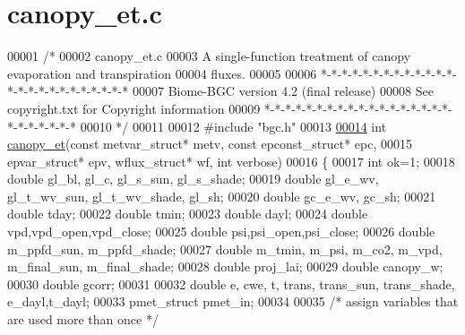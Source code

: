 \hypertarget{canopy__et_8c_source}{}\section{canopy\+\_\+et.\+c}
\label{canopy__et_8c_source}

\begin{DoxyCode}
00001 \textcolor{comment}{/* }
00002 \textcolor{comment}{canopy\_et.c}
00003 \textcolor{comment}{A single-function treatment of canopy evaporation and transpiration}
00004 \textcolor{comment}{fluxes.  }
00005 \textcolor{comment}{}
00006 \textcolor{comment}{*-*-*-*-*-*-*-*-*-*-*-*-*-*-*-*-*-*-*-*-*-*-*-*-*}
00007 \textcolor{comment}{Biome-BGC version 4.2 (final release)}
00008 \textcolor{comment}{See copyright.txt for Copyright information}
00009 \textcolor{comment}{*-*-*-*-*-*-*-*-*-*-*-*-*-*-*-*-*-*-*-*-*-*-*-*-*}
00010 \textcolor{comment}{*/}
00011 
00012 \textcolor{preprocessor}{#include "bgc.h"}
00013 
\hypertarget{canopy__et_8c_source_l00014}{}\hyperlink{canopy__et_8c_a5882089955eaa9ed13e938c6eb383b11}{00014} \textcolor{keywordtype}{int} \hyperlink{canopy__et_8c_a5882089955eaa9ed13e938c6eb383b11}{canopy\_et}(\textcolor{keyword}{const} metvar\_struct* metv, \textcolor{keyword}{const} epconst\_struct* epc, 
00015 epvar\_struct* epv, wflux\_struct* wf, \textcolor{keywordtype}{int} verbose)
00016 \{
00017     \textcolor{keywordtype}{int} ok=1;
00018     \textcolor{keywordtype}{double} gl\_bl, gl\_c, gl\_s\_sun, gl\_s\_shade;
00019     \textcolor{keywordtype}{double} gl\_e\_wv, gl\_t\_wv\_sun, gl\_t\_wv\_shade, gl\_sh;
00020     \textcolor{keywordtype}{double} gc\_e\_wv, gc\_sh;
00021     \textcolor{keywordtype}{double} tday;
00022     \textcolor{keywordtype}{double} tmin;
00023     \textcolor{keywordtype}{double} dayl;
00024     \textcolor{keywordtype}{double} vpd,vpd\_open,vpd\_close;
00025     \textcolor{keywordtype}{double} psi,psi\_open,psi\_close;
00026     \textcolor{keywordtype}{double} m\_ppfd\_sun, m\_ppfd\_shade;
00027     \textcolor{keywordtype}{double} m\_tmin, m\_psi, m\_co2, m\_vpd, m\_final\_sun, m\_final\_shade;
00028     \textcolor{keywordtype}{double} proj\_lai;
00029     \textcolor{keywordtype}{double} canopy\_w;
00030     \textcolor{keywordtype}{double} gcorr;
00031     
00032     \textcolor{keywordtype}{double} e, cwe, t, trans, trans\_sun, trans\_shade, e\_dayl,t\_dayl; 
00033     pmet\_struct pmet\_in;
00034 
00035     \textcolor{comment}{/* assign variables that are used more than once */}

\end{DoxyCode}
